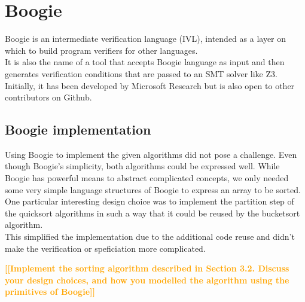 \documentclass{report}
\newcommand{\todo}[1]{\textsf{\textbf{\textcolor{orange}{[[#1]]}}}}
\begin{document}
\section{Boogie}
\label{s:boogie}
Boogie is an intermediate verification language (IVL), intended as a layer on which to build program verifiers for other languages\cite{boogiegithub}.\\
It is also the name of a tool that accepts Boogie language as input and then generates verification conditions that are passed to an SMT solver like Z3\cite{z3}.\\
Initially, it has been developed by Microsoft Research but is also open to other contributors on Github.

\subsection{Boogie implementation}

Using Boogie to implement the given algorithms did not pose a challenge.
Even though Boogie's simplicity, both algorithms could be expressed well.
While Boogie has powerful means to abstract complicated concepts, we only
needed some very simple language structures of Boogie to express an array to be sorted.\\
One particular interesting design choice was to implement the partition step
of the quicksort algorithms in such a way that it could be reused by the bucketsort algorithm.\\
This simplified the implementation due to the additional code reuse and didn't
make the verification or speficiation more complicated.

\todo{Implement the sorting algorithm described in
Section 3.2. Discuss your design choices, and how you modelled the algorithm using the
primitives of Boogie}
\end{document}
